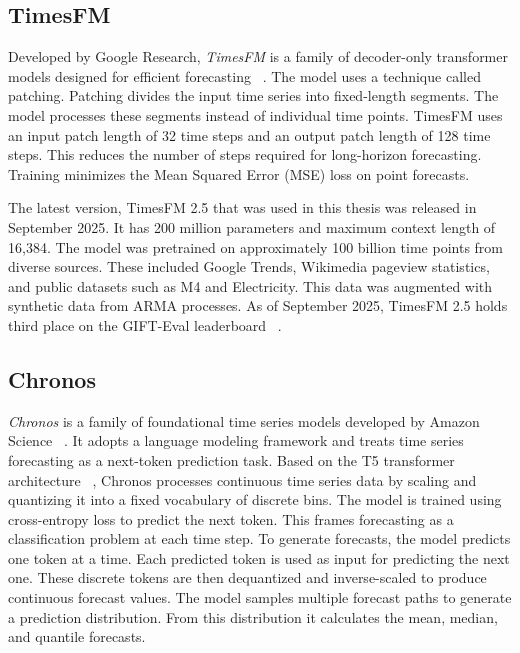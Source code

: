 \subsection{TimesFM}

Developed by Google Research, \emph{TimesFM} is a family of decoder-only transformer models designed for efficient forecasting ~\cite{das_decoder-only_2024}.
The model uses a technique called patching. Patching divides the input time series into fixed-length segments.
The model processes these segments instead of individual time points.
TimesFM uses an input patch length of 32 time steps and an output patch length of 128 time steps.
This reduces the number of steps required for long-horizon forecasting.
Training minimizes the Mean Squared Error (MSE) loss on point forecasts.

The latest version, TimesFM 2.5 that was used in this thesis was released in September 2025. It has 200 million parameters and maximum context length of 16,384.
The model was pretrained on approximately 100 billion time points from diverse sources. These included Google Trends, Wikimedia pageview statistics, and public datasets such as M4 and Electricity.
This data was augmented with synthetic data from ARMA processes.
As of September 2025, TimesFM 2.5 holds third place on the GIFT-Eval leaderboard ~\cite{GIFT-Eval_Leaderboard}.

\subsection{Chronos} 

\emph{Chronos} is a family of foundational time series models developed by Amazon Science ~\cite{ansari_chronos_2024}.
It adopts a language modeling framework and treats time series forecasting as a next-token prediction task.
Based on the T5 transformer architecture ~\cite{Raffel2020T5}, Chronos processes continuous time series data by scaling and quantizing it into a fixed vocabulary of discrete bins.
The model is trained using cross-entropy loss to predict the next token. This frames forecasting as a classification problem at each time step.
To generate forecasts, the model predicts one token at a time. Each predicted token is used as input for predicting the next one.
These discrete tokens are then dequantized and inverse-scaled to produce continuous forecast values.
The model samples multiple forecast paths to generate a prediction distribution. From this distribution it calculates the mean, median, and quantile forecasts.

